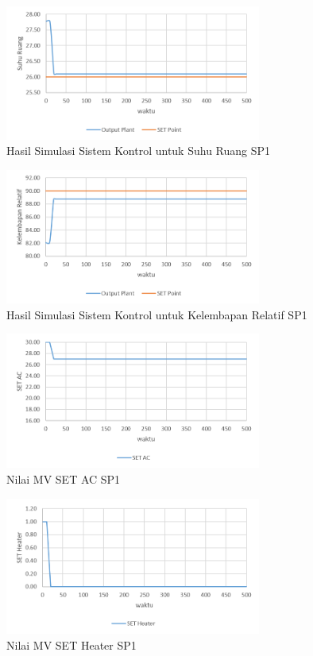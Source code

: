 \begin{figure}[!h]
	\centering
	\includegraphics[width=0.75\textwidth]{figures/SimulinkSP1Td}
	\caption{Hasil Simulasi Sistem Kontrol untuk Suhu Ruang SP1}
	\label{fig:5:SimulinkSP1Td}
\end{figure}

\begin{figure}[!h]
	\centering
	\includegraphics[width=0.75\textwidth]{figures/SimulinkSP1RH}
	\caption{Hasil Simulasi Sistem Kontrol untuk Kelembapan Relatif SP1}
	\label{fig:5:SimulinkSP1RH}
\end{figure}

\begin{figure}[!h]
	\centering
	\includegraphics[width=0.75\textwidth]{figures/SimulinkSP1AC}
	\caption{Nilai MV SET AC SP1}
	\label{fig:5:SimulinkSP1AC}
\end{figure}

\begin{figure}[!h]
	\centering
	\includegraphics[width=0.75\textwidth]{figures/SimulinkSP1HT}
	\caption{Nilai MV SET Heater SP1}
	\label{fig:5:SimulinkSP1HT}
\end{figure}


